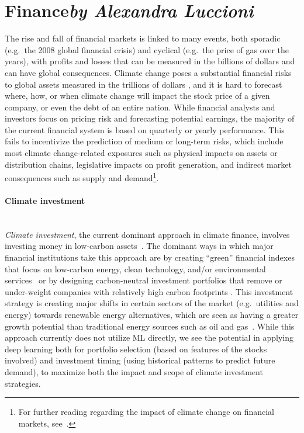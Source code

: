 \documentclass[11pt]{report}
\begin{document}
\section{Finance\texorpdfstring{\hfill\textit{by Alexandra Luccioni}}{}}
\label{sec:finance}

The rise and fall of financial markets is linked to many events, both sporadic (e.g.~the 2008 global financial crisis) and cyclical (e.g.~the price of gas over the years), with profits and losses that can be measured in the billions of dollars and can have global consequences. Climate change poses a substantial financial risks to global assets measured in the trillions of dollars \cite{dietz2016}, and it is hard to forecast where, how, or when climate change will impact the stock price of a given company, or even the debt of an entire nation. While financial analysts and investors focus on pricing risk and forecasting potential earnings, the majority of the current financial system is based on quarterly or yearly performance. This fails to incentivize the prediction of medium or long-term risks, which include most climate change-related exposures such as physical impacts on assets or distribution chains, legislative impacts on profit generation, and indirect market consequences such as supply and demand\footnote{For further reading regarding the impact of climate change on financial markets, see~\cite{boissinot2016, battiston2017,campiglio2018}.}.

\paragraph*{Climate investment}
\label{sec:climate-investment}\mbox{}\\
\emph{Climate investment}, the current dominant approach in climate finance, involves investing money in low-carbon assets~\cite{eyraud2013}. The dominant ways in which major financial institutions take this approach are by creating ``green'' financial indexes that focus on low-carbon energy, clean technology, and/or environmental services~\cite{diaz2017} or by designing carbon-neutral investment portfolios that remove or under-weight companies with relatively high carbon footprints \cite{gianfrate2018}. This investment strategy is creating major shifts in certain sectors of the market (e.g.~utilities and energy) towards renewable energy alternatives, which are seen as having a greater growth potential than traditional energy sources such as oil and gas~\cite{bergmann2006}. While this approach currently does not utilize ML directly, we see the potential in applying deep learning both for portfolio selection (based on features of the stocks involved) and investment timing (using historical patterns to predict future demand), to maximize both the impact and scope of climate investment strategies.
\end{document}
